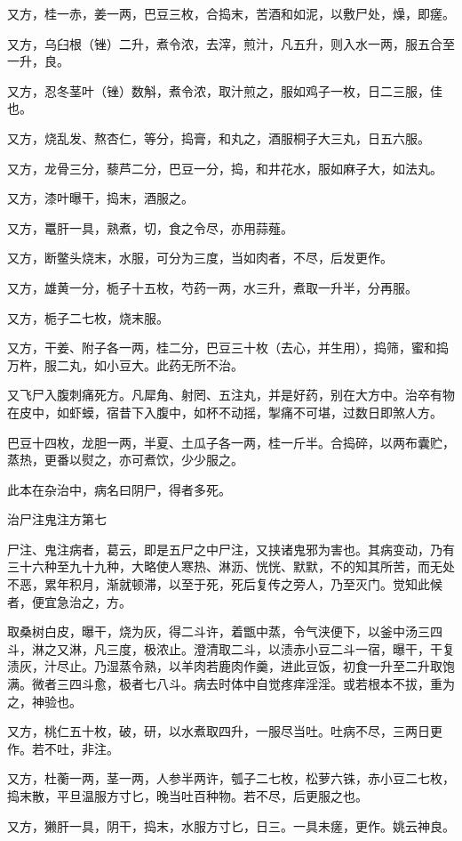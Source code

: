 \documentclass[12pt,UTF8]{ctexbook}
\begin{document}
又方，桂一赤，姜一两，巴豆三枚，合捣末，苦酒和如泥，以敷尸处，燥，即瘥。

又方，乌臼根（锉）二升，煮令浓，去滓，煎汁，凡五升，则入水一两，服五合至一升，良。

又方，忍冬茎叶（锉）数斛，煮令浓，取汁煎之，服如鸡子一枚，日二三服，佳也。

又方，烧乱发、熬杏仁，等分，捣膏，和丸之，酒服桐子大三丸，日五六服。

又方，龙骨三分，藜芦二分，巴豆一分，捣，和井花水，服如麻子大，如法丸。

又方，漆叶曝干，捣末，酒服之。

又方，鼍肝一具，熟煮，切，食之令尽，亦用蒜薤。

又方，断鳖头烧末，水服，可分为三度，当如肉者，不尽，后发更作。

又方，雄黄一分，栀子十五枚，芍药一两，水三升，煮取一升半，分再服。

又方，栀子二七枚，烧末服。

又方，干姜、附子各一两，桂二分，巴豆三十枚（去心，并生用），捣筛，蜜和捣万杵，服二丸，如小豆大。此药无所不治。

又飞尸入腹刺痛死方。凡犀角、射罔、五注丸，并是好药，别在大方中。治卒有物在皮中，如虾蟆，宿昔下入腹中，如杯不动摇，掣痛不可堪，过数日即煞人方。

巴豆十四枚，龙胆一两，半夏、土瓜子各一两，桂一斤半。合捣碎，以两布囊贮，蒸热，更番以熨之，亦可煮饮，少少服之。

此本在杂治中，病名曰阴尸，得者多死。

治尸注鬼注方第七

尸注、鬼注病者，葛云，即是五尸之中尸注，又挟诸鬼邪为害也。其病变动，乃有三十六种至九十九种，大略使人寒热、淋沥、恍恍、默默，不的知其所苦，而无处不恶，累年积月，渐就顿滞，以至于死，死后复传之旁人，乃至灭门。觉知此候者，便宜急治之，方。

取桑树白皮，曝干，烧为灰，得二斗许，着甑中蒸，令气浃便下，以釜中汤三四斗，淋之又淋，凡三度，极浓止。澄清取二斗，以渍赤小豆二斗一宿，曝干，干复渍灰，汁尽止。乃湿蒸令熟，以羊肉若鹿肉作羹，进此豆饭，初食一升至二升取饱满。微者三四斗愈，极者七八斗。病去时体中自觉疼痒淫淫。或若根本不拔，重为之，神验也。

又方，桃仁五十枚，破，研，以水煮取四升，一服尽当吐。吐病不尽，三两日更作。若不吐，非注。

又方，杜蘅一两，茎一两，人参半两许，瓠子二七枚，松萝六铢，赤小豆二七枚，捣末散，平旦温服方寸匕，晚当吐百种物。若不尽，后更服之也。

又方，獭肝一具，阴干，捣末，水服方寸匕，日三。一具未瘥，更作。姚云神良。
\end{document}
